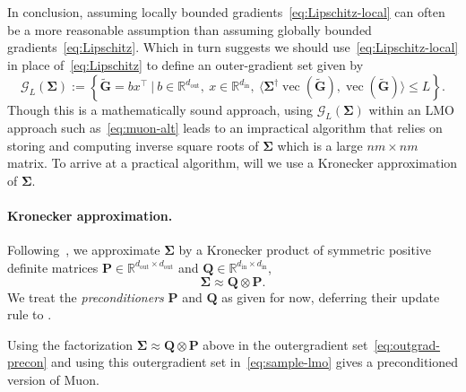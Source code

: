\documentclass[11pt]{article}
\renewcommand{\vec}{\operatorname{vec}}
\newcommand{\mat}[1]{\bm{#1}}
\newcommand{\R}{\mathbb{R}}
\newcommand{\ip}[1]{\langle #1 \rangle}
\begin{document}
In conclusion, assuming locally bounded gradients~\eqref{eq:Lipschitz-local} can often be a more reasonable assumption than assuming globally bounded gradients~\eqref{eq:Lipschitz}. 
Which in turn suggests we should use~\eqref{eq:Lipschitz-local} in place of~\eqref{eq:Lipschitz} to define an outer-gradient set given by 
\begin{equation} 
\label{eq:outgrad-precon} 
\mathcal{G}_L(\mat{\Sigma}) := \left \{ \widetilde{\mat{G}} = b x^\top ~\bigg |~  
b\in\mathbb{R}^{d_{\mathrm{out}}},
    \ x\in\mathbb{R}^{d_{\mathrm{in}}}, \
\ip{\mat{\Sigma}^\dagger \vec(\widetilde{\mat{G}}), \vec(\widetilde{\mat{G}})} \leq L \right \}.
\end{equation}
Though this is a mathematically sound approach, using $\mathcal{G}_L(\mat{\Sigma})$ within an LMO approach such as~\eqref{eq:muon-alt} leads to an impractical algorithm that relies on storing and computing inverse square roots of $\mat{\Sigma}$ which is a large $nm \times nm$ matrix. To arrive at a practical algorithm,  will we use a Kronecker approximation of $\mat{\Sigma}$.



\paragraph{Kronecker approximation.}
Following~\cite{shampoo,kfac}, we approximate $\mat{\Sigma}$ by a Kronecker product of symmetric positive definite matrices $\mat{P}\in \R^{d_{\mathrm{out}} \times d_{\mathrm{out}}}$ and $\mat{Q} \in\R^{d_{\mathrm{in}} \times d_{\mathrm{in}}}$,
\begin{equation} \label{eq:pq-factor}
     \mat{\Sigma}  \approx \mat{Q} \otimes \mat{P}.
\end{equation}
We treat the \emph{preconditioners} $\mat{P}$ and $\mat{Q}$ as given for now, deferring their update rule to .


Using the factorization $\mat{\Sigma}  \approx \mat{Q} \otimes \mat{P}$ above in the outergradient set~\eqref{eq:outgrad-precon}  and using this outergradient set in~\eqref{eq:sample-lmo} gives a preconditioned version of Muon.
\end{document}
